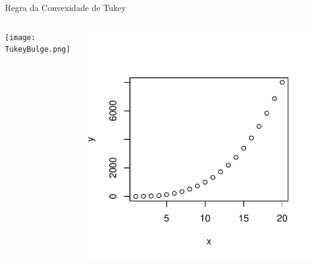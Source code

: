 \documentclass{beamer}\usepackage[]{graphicx}\usepackage[]{color}
\newenvironment{knitrout}{}{} %
\renewenvironment{knitrout}{\setlength{\topsep}{0mm}}{}
\begin{document}
\begin{frame}{Regra da Convexidade de Tukey}

\begin{columns}[c]

\centering
\texttt{[image: TukeyBulge.png]}

\centering
\begin{knitrout}
\color{fgcolor}
\includegraphics[width=0.7\linewidth]{figure/rem1-1} 

\end{knitrout}

\end{columns}

\end{frame}
\end{document}
